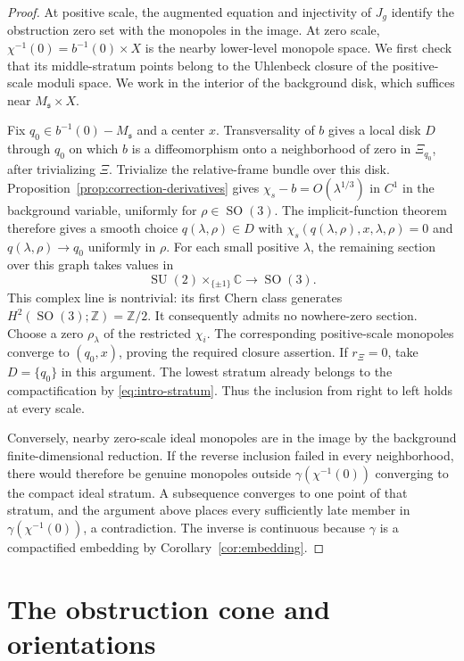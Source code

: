 \documentclass[11pt]{amsart}
\theoremstyle{definition}
\theoremstyle{remark}
\theoremstyle{plain}
\newcommand{\CC}{\mathbb{C}}
\newcommand{\SO}{\operatorname{SO}}
\newcommand{\SU}{\operatorname{SU}}
\begin{document}
\begin{proof}
At positive scale, the augmented equation and injectivity of $J_g$
identify the obstruction zero set with the monopoles in the image.
At zero scale, $\chi^{-1}(0)=b^{-1}(0)\times X$ is the nearby
lower-level monopole space.  We first check that its middle-stratum
points belong to the Uhlenbeck closure of the positive-scale moduli
space.  We work in the interior of the background disk, which suffices
near $M_{\mathfrak s}\times X$.

Fix $q_0\in b^{-1}(0)-M_{\mathfrak s}$ and a center $x$.
Transversality of $b$ gives a local disk $D$ through $q_0$ on which
$b$ is a diffeomorphism onto a neighborhood of zero in $\Xi_{q_0}$,
after trivializing $\Xi$.  Trivialize the relative-frame bundle over
this disk.  Proposition~\ref{prop:correction-derivatives} gives
$\chi_s-b=O(\lambda^{1/3})$ in $C^1$ in the background variable,
uniformly for $\rho\in\SO(3)$.  The implicit-function theorem
therefore gives a smooth choice $q(\lambda,\rho)\in D$ with
$\chi_s(q(\lambda,\rho),x,\lambda,\rho)=0$ and
$q(\lambda,\rho)\to q_0$ uniformly in $\rho$.
For each small positive $\lambda$, the remaining section over this
graph takes values in
\[
 \SU(2)\times_{\{\pm1\}}\CC\longrightarrow\SO(3).
\]
This complex line is nontrivial: its first Chern class generates
$H^2(\SO(3);\mathbb Z)=\mathbb Z/2$.
It consequently admits no nowhere-zero section.  Choose a zero
$\rho_\lambda$ of the restricted $\chi_i$.  The corresponding
positive-scale monopoles converge to $(q_0,x)$, proving the required
closure assertion.  If $r_\Xi=0$, take $D=\{q_0\}$ in this argument.
The lowest stratum already belongs to the compactification by
\eqref{eq:intro-stratum}.  Thus the inclusion from right to left
holds at every scale.

Conversely, nearby zero-scale ideal monopoles are in the image by
the background finite-dimensional reduction.  If the reverse
inclusion failed in every neighborhood, there would therefore be genuine
monopoles outside $\gamma(\chi^{-1}(0))$ converging to the compact ideal
stratum.  A subsequence converges to one point of that stratum, and the
argument above places every sufficiently late member in
$\gamma(\chi^{-1}(0))$, a contradiction.  The inverse is continuous because
$\gamma$ is a compactified embedding by Corollary~\ref{cor:embedding}.
\end{proof}

\section{The obstruction cone and orientations}\label{sec:orientations}
\end{document}
